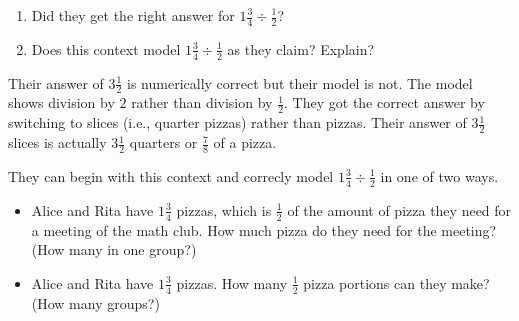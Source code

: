 \documentclass[nooutcomes]{ximera}
\begin{document}
\begin{problem}
\begin{enumerate}
\item Did they get the right answer for $1\frac{3}{4} \div \frac{1}{2}$?  
\item Does this context model $1\frac{3}{4} \div \frac{1}{2}$ as they claim?  Explain?  
\end{enumerate}

\begin{teachingnote}
Their answer of $3\frac{1}{2}$ is numerically correct but their model is not.  The model shows division by $2$ rather than division by $\frac{1}{2}$.  They got the correct answer by switching to slices (i.e., quarter pizzas) rather than pizzas.  Their answer of $3\frac{1}{2}$ slices is actually $3\frac{1}{2}$ quarters or $\frac{7}{8}$ of a pizza.

They can begin with this context and correcly model $1\frac{3}{4} \div \frac{1}{2}$ in one of two ways. 
\begin{itemize}
\item Alice and Rita have $1\frac{3}{4}$ pizzas, which is $\frac{1}{2}$ of the amount of pizza they need for a meeting of the math club.  How much pizza do they need for the meeting? (How many in one group?)
\item Alice and Rita have $1\frac{3}{4}$ pizzas.  How many $\frac{1}{2}$ pizza portions can they make? (How many groups?)
\end{itemize}
\end{teachingnote}

\end{problem}
\end{document}
